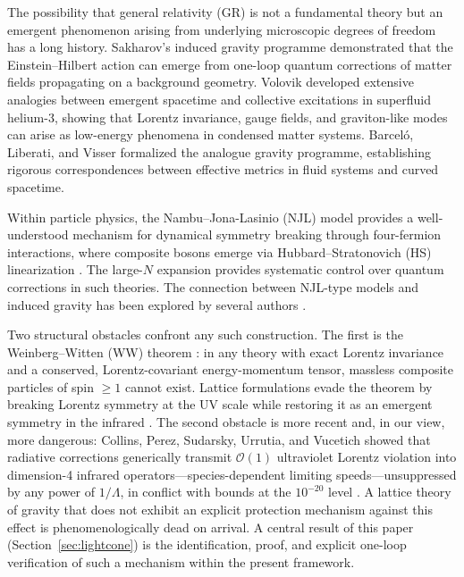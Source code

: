 \documentclass[11pt,a4paper]{article}
\begin{document}
The possibility that general relativity (GR) is not a fundamental
theory but an emergent phenomenon arising from underlying microscopic
degrees of freedom has a long history.
Sakharov's induced gravity programme \cite{Sakharov:1967pk}
demonstrated that the Einstein--Hilbert action can emerge from
one-loop quantum corrections of matter fields propagating on a
background geometry.
Volovik \cite{Volovik:2003fe} developed extensive analogies between
emergent spacetime and collective excitations in superfluid helium-3,
showing that Lorentz invariance, gauge fields, and graviton-like
modes can arise as low-energy phenomena in condensed matter systems.
Barcel\'{o}, Liberati, and Visser \cite{Barcelo:2005fc} formalized
the analogue gravity programme, establishing rigorous correspondences
between effective metrics in fluid systems and curved spacetime.

Within particle physics, the Nambu--Jona-Lasinio (NJL) model
\cite{Nambu:1961tp,Nambu:1961fr} provides a well-understood
mechanism for dynamical symmetry breaking through four-fermion
interactions, where composite bosons emerge via
Hubbard--Stratonovich (HS) linearization
\cite{Hubbard:1959ub,Stratonovich:1957}.
The large-$N$ expansion \cite{tHooft:1973alw,Coleman:1985rnk}
provides systematic control over quantum corrections in such
theories.
The connection between NJL-type models and induced gravity
has been explored by several authors
\cite{Akama:1978pg,Zee:1981,Amati:1982bp}.

Two structural obstacles confront any such construction.
The first is the Weinberg--Witten (WW) theorem
\cite{Weinberg:1980kq}: in any theory with exact Lorentz invariance
and a conserved, Lorentz-covariant energy-momentum tensor, massless
composite particles of spin $\geq 1$ cannot exist.
Lattice formulations evade the theorem by breaking Lorentz symmetry
at the UV scale while restoring it as an emergent symmetry in the
infrared \cite{Volovik:2003fe,Barcelo:2005fc}.
The second obstacle is more recent and, in our view, more
dangerous: Collins, Perez, Sudarsky, Urrutia, and Vucetich
\cite{Collins:2004bp} showed that radiative corrections generically
transmit $\mathcal{O}(1)$ ultraviolet Lorentz violation into
dimension-4 infrared operators---species-dependent limiting
speeds---unsuppressed by any power of $1/\Lambda$, in conflict with
bounds at the $10^{-20}$ level \cite{Liberati:2013xla}.
A lattice theory of gravity that does not exhibit an explicit
protection mechanism against this effect is phenomenologically
dead on arrival.
A central result of this paper (Section~\ref{sec:lightcone}) is the
identification, proof, and explicit one-loop verification of such a
mechanism within the present framework.
\end{document}

